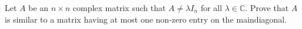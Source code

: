 Let \(A\) be an \(n\times n\) complex matrix such that  \(A \ne \lambda I_{n}\)  for all \(\lambda \in \mathbb{C}\). Prove that \(A\) is similar to a matrix having at most one non-zero entry on the maindiagonal.